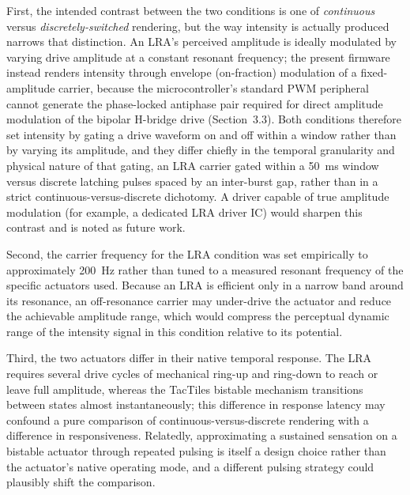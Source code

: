 \documentclass[12pt, a4paper]{report}
\begin{document}
First, the intended contrast between the two conditions is one of \emph{continuous} versus \emph{discretely-switched} rendering, but the way intensity is actually produced narrows that distinction. An LRA's perceived amplitude is ideally modulated by varying drive amplitude at a constant resonant frequency; the present firmware instead renders intensity through envelope (on-fraction) modulation of a fixed-amplitude carrier, because the microcontroller's standard PWM peripheral cannot generate the phase-locked antiphase pair required for direct amplitude modulation of the bipolar H-bridge drive (Section~3.3). Both conditions therefore set intensity by gating a drive waveform on and off within a window rather than by varying its amplitude, and they differ chiefly in the temporal granularity and physical nature of that gating, an LRA carrier gated within a 50~ms window versus discrete latching pulses spaced by an inter-burst gap, rather than in a strict continuous-versus-discrete dichotomy. A driver capable of true amplitude modulation (for example, a dedicated LRA driver IC) would sharpen this contrast and is noted as future work.

Second, the carrier frequency for the LRA condition was set empirically to approximately 200~Hz rather than tuned to a measured resonant frequency of the specific actuators used. Because an LRA is efficient only in a narrow band around its resonance, an off-resonance carrier may under-drive the actuator and reduce the achievable amplitude range, which would compress the perceptual dynamic range of the intensity signal in this condition relative to its potential.

Third, the two actuators differ in their native temporal response. The LRA requires several drive cycles of mechanical ring-up and ring-down to reach or leave full amplitude, whereas the TacTiles bistable mechanism transitions between states almost instantaneously; this difference in response latency may confound a pure comparison of continuous-versus-discrete rendering with a difference in responsiveness. Relatedly, approximating a sustained sensation on a bistable actuator through repeated pulsing is itself a design choice rather than the actuator's native operating mode, and a different pulsing strategy could plausibly shift the comparison.
\end{document}

